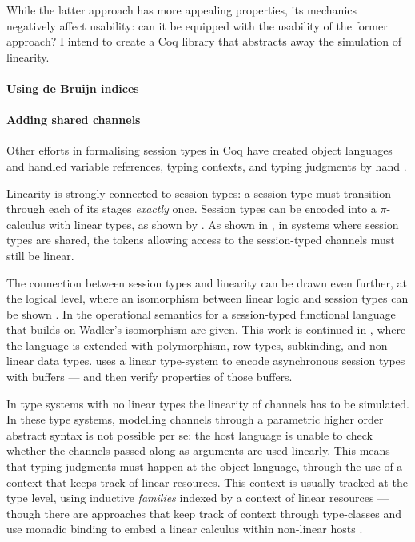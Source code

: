 \documentclass{mproj}
\newcommand{\picalc}{$\pi$-calculus}
\begin{document}
While the latter approach has more appealing properties, its mechanics negatively affect usability: can it be equipped with the usability of the former approach? I intend to create a Coq library that abstracts away the simulation of linearity.

\paragraph{Using de Bruijn indices}

\paragraph{Adding shared channels}
Other efforts in formalising session types in Coq have created object languages and handled variable references, typing contexts, and typing judgments by hand \cite{Dilmore2019}.

Linearity is strongly connected to session types: a session type must transition through each of its stages \emph{exactly} once. Session types can be encoded into a \picalc{} with linear types, as shown by \cite{Kobayashi1996,Dardha2012,Dardha2016}. As shown in \cite{Voinea}, in systems where session types are shared, the tokens allowing access to the session-typed channels must still be linear.

The connection between session types and linearity can be drawn even further, at the logical level, where an isomorphism between linear logic and session types can be shown \cite{Caires2010} \cite{Wadler2014}. In \cite{Lindley2015} the operational semantics for a session-typed functional language that builds on Wadler's isomorphism are given. This work is continued in \cite{Lindley}, where the language is extended with polymorphism, row types, subkinding, and non-linear data types. \cite{Gay2010} uses a linear type-system to encode asynchronous session types with buffers --- and then verify properties of those buffers.

In type systems with no linear types the linearity of channels has to be simulated. In these type systems, modelling channels through a parametric higher order abstract syntax \cite{Chlipala2008} is not possible per se: the host language is unable to check whether the channels passed along as arguments are used linearly. This means that typing judgments must happen at the object language, through the use of a context that keeps track of linear resources.  This context is usually tracked at the type level, using inductive \emph{families} \cite{Dybjer1994} indexed by a context of linear resources \cite{Power2000} --- though there are approaches that keep track of context through type-classes and use monadic binding to embed a linear calculus within non-linear hosts \cite{Paykin2017}.
\end{document}
